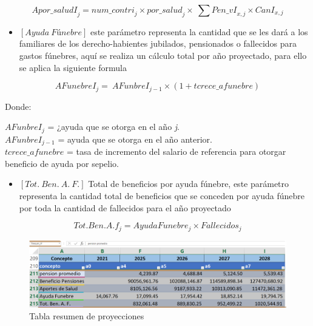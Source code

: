 \documentclass[
  letterpaper,
  DIV=11,
  numbers=noendperiod]{scrreprt}
\providecommand{\tightlist}{%
  \setlength{\itemsep}{0pt}\setlength{\parskip}{0pt}}\usepackage{longtable,booktabs,array}
\begin{document}
\begin{equation}
{Apor\_saludI}_j={num\_contri}_j\times{por\_salud}_j\times\ \sum{{Pen\_vI}_{x,j}\times{CanI}_{x,j}}
\end{equation}

\begin{itemize}
\tightlist
\item
  \([Ayuda\ Fúnebre]\) este parámetro representa la cantidad que se les
  dará a los familiares de los derecho-habientes jubilados, pensionados
  o fallecidos para gastos fúnebres, aquí se realiza un cálculo total
  por año proyectado, para ello se aplica la siguiente formula
\end{itemize}

\begin{equation}
AFunebr{eI}_j=\ AFunbr{eI}_{j-1}\times(1+tcrece\_afunebre)
\end{equation}

Donde:

\(AFunbr{eI}_j\) = ¿ayuda que se otorga en el año \emph{j}.\\
\(AFunbr{eI}_{j-1}\) = ayuda que se otorga en el año anterior.\\
\(tcrece\_afunebre\) = tasa de incremento del salario de referencia para
otorgar beneficio de ayuda por sepelio.

\begin{itemize}
\tightlist
\item
  \([Tot.\ Ben.\ A.\ F.]\) Total de beneficios por ayuda fúnebre, este
  parámetro representa la cantidad total de beneficios que se conceden
  por ayuda fúnebre por toda la cantidad de fallecidos para el año
  proyectado
\end{itemize}

\begin{equation}
Tot.Ben.A.f_j=AyudaFunebre_j\times{Fallecidos}_j
\end{equation}

\begin{figure}

{\centering \includegraphics{images/F/Img37.png}

}

\caption{Tabla resumen de proyecciones}

\end{figure}
\end{document}
